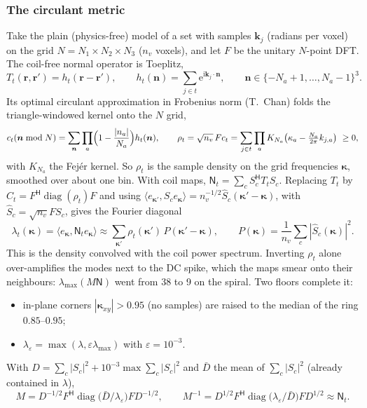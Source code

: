 \documentclass[11pt]{article}
\theoremstyle{remark}
\newcommand{\rr}{\bm r}
\newcommand{\kk}{\bm k}
\newcommand{\ii}{\mathrm i}
\newcommand{\ee}{\mathrm e}
\newcommand{\Nop}{\mathsf N}
\newcommand{\herm}{\mathsf H}
\newcommand{\diag}{\operatorname{diag}}
\begin{document}
\subsubsection*{The circulant metric}
Take the plain (physics-free) model of a set with samples $\kk_j$ (radians per voxel) on the grid $N=N_1\times N_2\times N_3$ ($n_v$ voxels), and let $F$ be the unitary $N$-point DFT.
The coil-free normal operator is Toeplitz,
\[
  T_t(\rr,\rr')=h_t(\rr-\rr'),\qquad h_t(\bm n)=\sum_{j\in t}\ee^{\ii\kk_j\cdot\bm n},\qquad \bm n\in\{-N_a{+}1,\dots,N_a{-}1\}^3 .
\]
Its optimal circulant approximation in Frobenius norm (T.~Chan) folds the triangle-windowed kernel onto the $N$ grid,
\[
  c_t(\bm n\bmod N)=\sum_{\bm n}\prod_a\Bigl(1-\frac{|n_a|}{N_a}\Bigr)h_t(\bm n),\qquad
  \rho_t=\sqrt{n_v}\,Fc_t=\sum_{j\in t}\prod_a K_{N_a}\bigl(\kappa_a-\tfrac{N_a}{2\pi}k_{j,a}\bigr)\ \ge 0,
\]
with $K_{N_a}$ the Fej\'er kernel. So $\rho_t$ is the sample density on the grid frequencies $\bm\kappa$, smoothed over about one bin.
With coil maps, $\Nop_t=\sum_cS_c^\herm T_tS_c$.
Replacing $T_t$ by $C_t=F^\herm\diag(\rho_t)F$ and using $\langle e_{\bm\kappa'},S_ce_{\bm\kappa}\rangle=n_v^{-1/2}\hat S_c(\bm\kappa'-\bm\kappa)$, with $\hat S_c=\sqrt{n_v}FS_c$, gives the Fourier diagonal
\begin{equation}
  \lambda_t(\bm\kappa)=\langle e_{\bm\kappa},\Nop_te_{\bm\kappa}\rangle\approx\sum_{\bm\kappa'}\rho_t(\bm\kappa')\,P(\bm\kappa'-\bm\kappa),\qquad P(\bm\kappa)=\frac1{n_v}\sum_c|\hat S_c(\bm\kappa)|^2 .
  \label{eq:circdiag}
\end{equation}
This is the density convolved with the coil power spectrum. Inverting $\rho_t$ alone over-amplifies the modes next to the DC spike, which the maps smear onto their neighbours: $\lambda_{\max}(M\Nop)$ went from 38 to 9 on the spiral.
Two floors complete it:
\begin{itemize}
  \item in-plane corners $|\bm\kappa_{xy}|>0.95$ (no samples) are raised to the median of the ring $0.85$--$0.95$;
  \item $\lambda_\varepsilon=\max(\lambda,\varepsilon\lambda_{\max})$ with $\varepsilon=10^{-3}$.
\end{itemize}
With $D=\sum_c|S_c|^2+10^{-3}\max\sum_c|S_c|^2$ and $\bar D$ the mean of $\sum_c|S_c|^2$ (already contained in $\lambda$),
\begin{equation}
  M=D^{-1/2}F^\herm\diag\bigl(\bar D/\lambda_\varepsilon\bigr)FD^{-1/2},\qquad
  M^{-1}=D^{1/2}F^\herm\diag\bigl(\lambda_\varepsilon/\bar D\bigr)FD^{1/2}\approx\Nop_t .
  \label{eq:circM}
\end{equation}
\end{document}
